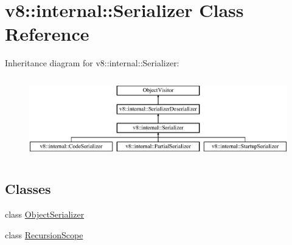 \hypertarget{classv8_1_1internal_1_1_serializer}{}\section{v8\+:\+:internal\+:\+:Serializer Class Reference}
\label{classv8_1_1internal_1_1_serializer}
Inheritance diagram for v8\+:\+:internal\+:\+:Serializer\+:\begin{figure}[H]
\begin{center}
\leavevmode
\includegraphics[height=3.555556cm]{classv8_1_1internal_1_1_serializer}
\end{center}
\end{figure}
\subsection*{Classes}
\begin{DoxyCompactItemize}
\item 
class \hyperlink{classv8_1_1internal_1_1_serializer_1_1_object_serializer}{Object\+Serializer}
\item 
class \hyperlink{classv8_1_1internal_1_1_serializer_1_1_recursion_scope}{Recursion\+Scope}
\end{DoxyCompactItemize}
